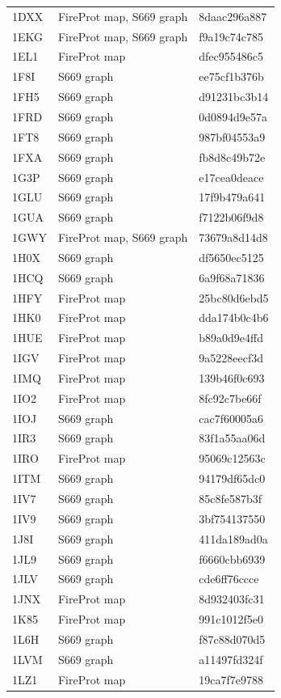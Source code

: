 \begin{longtable}{lll}
1DXX & FireProt map, S669 graph & 8daac296a887\\
1EKG & FireProt map, S669 graph & f9a19c74c785\\
1EL1 & FireProt map & dfec955486c5\\
1F8I & S669 graph & ee75cf1b376b\\
1FH5 & S669 graph & d91231bc3b14\\
1FRD & S669 graph & 0d0894d9e57a\\
1FT8 & S669 graph & 987bf04553a9\\
1FXA & S669 graph & fb8d8c49b72e\\
1G3P & S669 graph & e17cea0deace\\
1GLU & S669 graph & 17f9b479a641\\
1GUA & S669 graph & f7122b06f9d8\\
1GWY & FireProt map, S669 graph & 73679a8d14d8\\
1H0X & S669 graph & df5650ec5125\\
1HCQ & S669 graph & 6a9f68a71836\\
1HFY & FireProt map & 25bc80d6ebd5\\
1HK0 & FireProt map & dda174b0c4b6\\
1HUE & FireProt map & b89a0d9e4ffd\\
1IGV & FireProt map & 9a5228eecf3d\\
1IMQ & FireProt map & 139b46f0c693\\
1IO2 & FireProt map & 8fc92c7be66f\\
1IOJ & S669 graph & cac7f60005a6\\
1IR3 & S669 graph & 83f1a55aa06d\\
1IRO & FireProt map & 95069c12563c\\
1ITM & S669 graph & 94179df65dc0\\
1IV7 & S669 graph & 85c8fe587b3f\\
1IV9 & S669 graph & 3bf754137550\\
1J8I & S669 graph & 411da189ad0a\\
1JL9 & S669 graph & f6660cbb6939\\
1JLV & S669 graph & cde6ff76ccce\\
1JNX & FireProt map & 8d932403fc31\\
1K85 & FireProt map & 991c1012f5e0\\
1L6H & S669 graph & f87c88d070d5\\
1LVM & S669 graph & a11497fd324f\\
1LZ1 & FireProt map & 19ca7f7e9788\\

\end{longtable}
